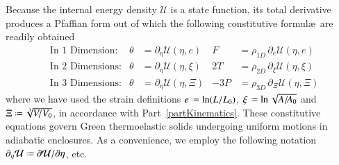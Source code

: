 Because the internal energy density $\mathcal{U}$ is a state function, its total derivative produces a Pfaffian form \cite{Caratheodory09} out of which the following constitutive formul\ae\ are readily obtained
\begin{subequations}
    \label{GreenElasticCEs}
    \begin{align}
    \mbox{} & \text{In 1 Dimension:} & 
    \theta & = \partial_{\eta} \mathcal{U} ( \eta , e) &
    F & = \rho_{1D} \, \partial_e \mathcal{U} ( \eta , e) \\
    \mbox{} & \text{In 2 Dimensions:} &
    \theta & = \partial_{\eta} \mathcal{U} ( \eta , \xi) &
    2T & = \rho_{2D} \, \partial_{\xi} \mathcal{U} ( \eta , \xi) \\
    \mbox{} & \text{In 3 Dimensions:} &
    \theta & = \partial_{\eta} \mathcal{U} ( \eta ,  \Xi) &
    -3P & = \rho_{3D} \, \partial_{\Xi} \mathcal{U} ( \eta ,  \Xi)
    \end{align}
\end{subequations}
where we have used the strain definitions $e \defeq \ln ( L / L_0 )$, $\xi \defeq \ln \sqrt{ A / \! A_0 }$ and $\Xi \defeq \sqrt[3]{V \! / V_0}$, in accordance with Part~\ref{partKinematics}. These constitutive equations govern Green thermo\-elastic solids undergoing uniform motions in adiabatic enclosures.  As a convenience, we employ the following notation $\partial_{\eta} \mathcal{U} \defeq \partial \mathcal{U} / \partial \eta$, etc.

